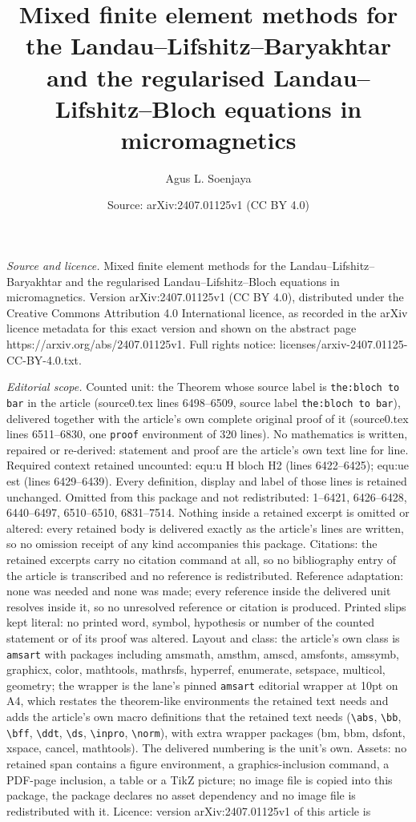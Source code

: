 \documentclass[10pt,a4paper]{amsart}
\title[Mixed finite element methods for the Landau--Lifshitz--Barya]{Mixed finite element methods for the Landau--Lifshitz--Baryakhtar and the regularised Landau--Lifshitz--Bloch equations in micromagnetics}
\author{Agus L. Soenjaya}
\date{Source: arXiv:2407.01125v1 (CC BY 4.0)}
\begin{document}
\maketitle

\noindent\emph{Source and licence.} Mixed finite element methods for the Landau--Lifshitz--Baryakhtar and the regularised Landau--Lifshitz--Bloch equations in micromagnetics. Version arXiv:2407.01125v1 (CC BY 4.0), distributed under the Creative Commons Attribution 4.0 International licence, as recorded in the arXiv licence metadata for this exact version and shown on the abstract page https://arxiv.org/abs/2407.01125v1. Full rights notice: licenses/arxiv-2407.01125-CC-BY-4.0.txt.\par\smallskip

\noindent\textit{Editorial scope.} Counted unit: the Theorem whose source label is \texttt{the:bloch to bar} in the article (source0.tex lines 6498--6509, source label \texttt{the:bloch to bar}), delivered together with the article's own complete original proof of it (source0.tex lines 6511--6830, one \texttt{proof} environment of 320 lines). No mathematics is written, repaired or re-derived: statement and proof are the article's own text line for line. Required context retained uncounted: equ:u H bloch H2 (lines 6422--6425); equ:ue est (lines 6429--6439). Every definition, display and label of those lines is retained unchanged. Omitted from this package and not redistributed: 1--6421, 6426--6428, 6440--6497, 6510--6510, 6831--7514. Nothing inside a retained excerpt is omitted or altered: every retained body is delivered exactly as the article's lines are written, so no omission receipt of any kind accompanies this package. Citations: the retained excerpts carry no citation command at all, so no bibliography entry of the article is transcribed and no reference is redistributed. Reference adaptation: none was needed and none was made; every reference inside the delivered unit resolves inside it, so no unresolved reference or citation is produced. Printed slips kept literal: no printed word, symbol, hypothesis or number of the counted statement or of its proof was altered. Layout and class: the article's own class is \texttt{amsart} with packages including amsmath, amsthm, amscd, amsfonts, amssymb, graphicx, color, mathtools, mathrsfs, hyperref, enumerate, setspace, multicol, geometry; the wrapper is the lane's pinned \texttt{amsart} editorial wrapper at 10pt on A4, which restates the theorem-like environments the retained text needs and adds the article's own macro definitions that the retained text needs (\texttt{\textbackslash abs}, \texttt{\textbackslash bb}, \texttt{\textbackslash bff}, \texttt{\textbackslash ddt}, \texttt{\textbackslash ds}, \texttt{\textbackslash inpro}, \texttt{\textbackslash norm}), with extra wrapper packages (bm, bbm, dsfont, xspace, cancel, mathtools). The delivered numbering is the unit's own. Assets: no retained span contains a figure environment, a graphics-inclusion command, a PDF-page inclusion, a table or a TikZ picture; no image file is copied into this package, the package declares no asset dependency and no image file is redistributed with it. Licence: version arXiv:2407.01125v1 of this article is 
\end{document}
